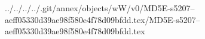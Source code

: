 ../../../../.git/annex/objects/wW/v0/MD5E-s5207--aeff05330d39ae98f580e4f78d09bfdd.tex/MD5E-s5207--aeff05330d39ae98f580e4f78d09bfdd.tex